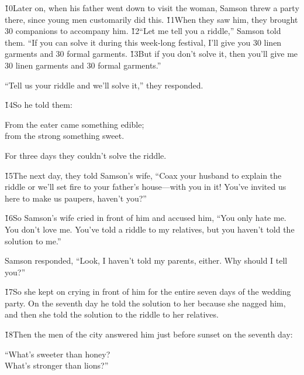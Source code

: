 \v{10}Later on, when his father went down to visit the woman, Samson threw a party there, since young men customarily did this. \v{11}When they saw him, they brought 30 companions to accompany him. \v{12}``Let me tell you a riddle,'' Samson told them. ``If you can solve it during this week-long festival, I'll give you 30 linen garments and 30 formal garments. \v{13}But if you don't solve it, then you'll give me 30 linen garments and 30 formal garments.''

``Tell us your riddle and we'll solve it,'' they responded.

\v{14}So he told them:

\begin{poetry}
\poeml From the eater came something edible; \\
\poemll    from the strong something sweet.
\end{poetry}

For three days they couldn't solve the riddle.

\v{15}The next day, they told Samson's wife, ``Coax your husband to explain the riddle or we'll set fire to your father's house---with you in it! You've invited us here to make us paupers, haven't you?''

\v{16}So Samson's wife cried in front of him and accused him, ``You only hate me. You don't love me. You've told a riddle to my relatives, but you haven't told the solution to me.''

Samson responded, ``Look, I haven't told my parents, either. Why should I tell you?''

\v{17}So she kept on crying in front of him for the entire seven days of the wedding party. On the seventh day he told the solution to her because she nagged him, and then she told the solution to the riddle to her relatives.

\v{18}Then the men of the city answered him just before sunset on the seventh day:

\begin{poetry}
\poeml ``What's sweeter than honey? \\
\poemll    What's stronger than lions?''
\end{poetry}

